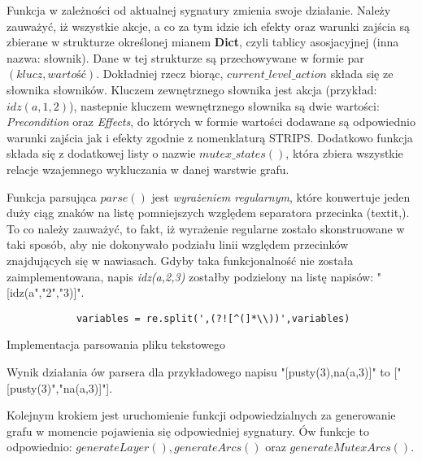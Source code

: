     Funkcja w zależności od aktualnej sygnatury zmienia swoje działanie. Należy zauważyć, iż wszystkie akcje, a co za tym idzie ich efekty oraz 
    warunki zajścia są zbierane w strukturze określonej mianem \textbf{Dict}, czyli tablicy asosjacyjnej (inna nazwa: słownik). 
    Dane w tej strukturze są przechowywane w formie par $(klucz,wartość)$. Dokładniej rzecz biorąc, $current\_level\_action$ składa się ze słownika 
    słowników. Kluczem zewnętrznego słownika jest akcja (przykład: $idz(a,1,2)$), nastepnie kluczem wewnętrznego słownika są dwie wartości: 
    \textit{Precondition} oraz \textit{Effects}, do których w formie wartości dodawane są odpowiednio warunki zajścia jak i efekty zgodnie 
    z nomenklaturą STRIPS.
    Dodatkowo funkcja składa się z dodatkowej listy o nazwie $mutex\_states()$, która zbiera wszystkie relacje wzajemnego wykluczania w 
    danej warstwie grafu. 

    Funkcja parsująca $parse()$ jest \textit{wyrażeniem regularnym}, które konwertuje jeden duży ciąg znaków na listę pomniejszych względem 
    separatora przecinka (textit{,}). To co należy zauważyć, to fakt, iż wyrażenie regularne zostało skonstruowane w taki sposób, aby nie 
    dokonywało podziału linii względem przecinków znajdujących się w nawiasach. Gdyby taka funkcjonalność nie została zaimplementowana, napis 
    \textit{idz(a,2,3)} zostałby podzielony na listę napisów: "[idz(a","2","3)]". 

    \begin{listing}[H]
        \begin{verbatim}
            variables = re.split(',(?![^(]*\\))',variables)
        \end{verbatim}
    \caption{Implementacja parsowania pliku tekstowego}
    \label{REGEX}
    \end{listing}
    Wynik działania ów parsera dla przykładowego napisu "[pusty(3),na(a,3)]" to ["[pusty(3)","na(a,3)]"].

    Kolejnym krokiem jest uruchomienie funkcji odpowiedzialnych za generowanie grafu w momencie pojawienia się odpowiedniej sygnatury. 
    Ów funkcje to odpowiednio: $generateLayer(), generateArcs()$ oraz $generateMutexArcs()$.

